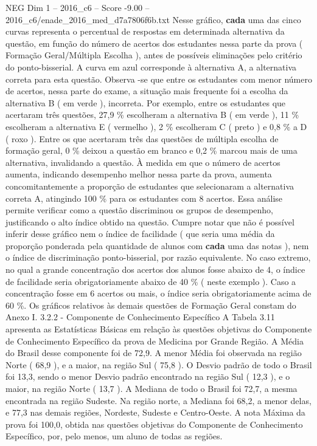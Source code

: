 \begin{textsample}{NEG Dim 1 – 2016\_c6 – Score -9.00 – 2016\_c6/enade\_2016\_med\_d7a7806f6b.txt}
Nesse gráfico, \textbf{cada} uma das cinco curvas representa o percentual de respostas em determinada alternativa da questão, em função do número de acertos dos estudantes nessa parte da prova ( Formação Geral/Múltipla Escolha ), antes de possíveis eliminações pelo critério do ponto-bisserial.
A curva em azul corresponde à alternativa A, a alternativa correta para esta questão.
Observa -se que entre os estudantes com menor número de acertos, nessa parte do exame, a situação mais frequente foi a escolha da alternativa B ( em verde ), incorreta.
Por exemplo, entre os estudantes que acertaram três questões, 27,9 \% escolheram a alternativa B ( em verde ), 11 \% escolheram a alternativa E ( vermelho ), 2 \% escolheram C ( preto ) e 0,8 \% a D ( roxo ).
Entre os que acertaram três das questões de múltipla escolha de formação geral, 0 \% deixou a questão em branco e 0,2 \% marcou mais de uma alternativa, invalidando a questão.
À medida em que o número de acertos aumenta, indicando desempenho melhor nessa parte da prova, aumenta concomitantemente a proporção de estudantes que selecionaram a alternativa correta A, atingindo 100 \% para os estudantes com 8 acertos.
Essa análise permite verificar como a questão discriminou os grupos de desempenho, justificando o alto índice obtido na questão.
Cumpre notar que não é possível inferir desse gráfico nem o índice de facilidade ( que seria uma média da proporção ponderada pela quantidade de alunos com \textbf{cada} uma das notas ), nem o índice de discriminação ponto-bisserial, por razão equivalente.
No caso extremo, no qual a grande concentração dos acertos dos alunos fosse abaixo de 4, o índice de facilidade seria obrigatoriamente abaixo de 40 \% ( neste exemplo ).
Caso a concentração fosse em 6 acertos ou mais, o índice seria obrigatoriamente acima de 60 \%.
Os gráficos relativos às demais questões de Formação Geral constam do Anexo I. 3.2.2 - Componente de Conhecimento Específico A Tabela 3.11 apresenta as Estatísticas Básicas em relação às questões objetivas do Componente de Conhecimento Específico da prova de Medicina por Grande Região.
A Média do Brasil desse componente foi de 72,9.
A menor Média foi observada na região Norte ( 68,9 ), e a maior, na região Sul ( 75,8 ).
O Desvio padrão de todo o Brasil foi 13,3, sendo o menor Desvio padrão encontrado na região Sul ( 12,3 ), e o maior, na região Norte ( 13,7 ).
A Mediana de todo o Brasil foi 72,7, a mesma encontrada na região Sudeste.
Na região norte, a Mediana foi 68,2, a menor delas, e 77,3 nas demais regiões, Nordeste, Sudeste e Centro-Oeste.
A nota Máxima da prova foi 100,0, obtida nas questões objetivas do Componente de Conhecimento Específico, por, pelo menos, um aluno de todas as regiões.

\end{textsample}
